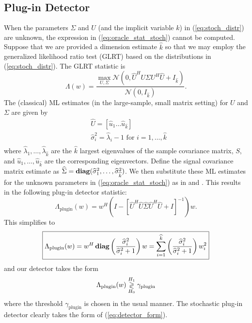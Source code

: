 \subsection{Plug-in Detector}\label{sec:plugin_stoch}
When the parameters $\Sigma$ and $U$ (and the implicit variable $k$) in (\ref{eq:stoch_distr}) are unknown, the expression in (\ref{eq:oracle_stat_stoch}) cannot be computed. Suppose that we are provided a dimension estimate $\widehat{k}$ so that we may employ the generalized likelihood ratio test (GLRT) based on the distributions in (\ref{eq:stoch_distr}). The GLRT statistic is
\begin{equation*}
\Lambda(w) = \frac{\max_{U,\Sigma}\mathcal{N}(0,\widehat{U}^HU\Sigma U^H\widehat{U} + I_{\widehat{k}})}{\mathcal{N}(0,I_{\widehat{k}})}.
\end{equation*}
The (classical) ML estimates (in the large-sample, small matrix setting) for $U$ and $\Sigma$ are given by \cite{muirhead1982aspects}
\begin{equation}\label{eq:param_estims_stoch}
\begin{aligned}
&\widehat{U}=[\widehat{u}_1 \dots \widehat{u}_{\widehat{k}}]\\
&\widehat{\sigma}_i^2 = \widehat{\lambda}_i -1 \text{ for } i=1,\dots,\widehat{k}\\
\end{aligned}
\end{equation}
where $\widehat{\lambda}_1,\dots,\widehat{\lambda}_{\widehat{k}}$ are the $\widehat{k}$  largest eigenvalues of the sample covariance matrix, $S$, and $\widehat{u}_1,\dots,\widehat{u}_{\widehat{k}}$ are the corresponding eigenvectors. Define the signal covariance matrix estimate as $\widehat{\Sigma}=\mathop{\bf diag}(\widehat{\sigma}_1^2,\dots,\widehat{\sigma}_{\widehat{k}}^2)$. We then substitute these ML estimates for the unknown parameters in (\ref{eq:oracle_stat_stoch}) as in \cite{jin2005cfar} and \cite{mcwhorter2003matched}. This results in the following plug-in detector statistic:
\begin{equation*}
\Lambda_{\text{plugin}}(w)= w^H\left(I-\left[\widehat{U}^H\widehat{U}\widehat{\Sigma}\widehat{U}^H\widehat{U} + I\right]^{-1}\right)w.
\end{equation*}
This simplifies to
\begin{equation}\label{eq:plugin_stat_stoch}
\boxed{\Lambda_{\text{plugin}}(w) = w^H\diag\left(\frac{\widehat{\sigma}^2_i}{\widehat{\sigma}^2_i+1}\right)w=\sum_{i=1}^{\widehat{k}}\left(\frac{\widehat{\sigma}_i^2}{\widehat{\sigma}_i^2+1}\right)w_i^2}
\end{equation}
and our detector takes the form
\begin{equation}\label{eq:plugin_class_stoch}
{\Lambda_{\text{plugin}}(w) \detgtrless \gamma_{\text{plugin}}}
\end{equation}
where the threshold $\gamma_{\text{plugin}}$ is chosen in the usual manner. The stochastic plug-in detector clearly takes the form of (\ref{eq:detector_form}).

